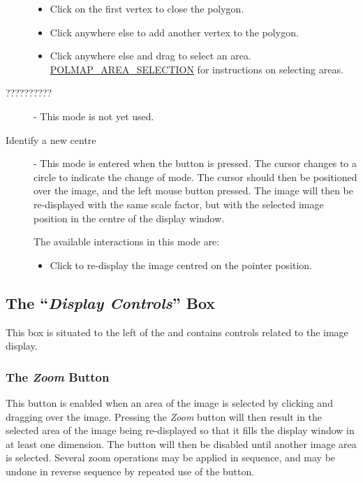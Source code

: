 \begin{description}
\begin{itemize}
\item Click on the first vertex to close the polygon.
\item Click anywhere else to add another vertex to the polygon.
\item Click anywhere else and drag to select an area. \hyperref{Go here}{See
section }{}{POLMAP_AREA_SELECTION} for instructions on selecting areas.
\end{itemize}

\item [\mylabel{POLMAP_MODE_3} ??????????] - This mode is not yet used.

\item [\mylabel{POLMAP_MODE_4} Identify a new centre] - This mode is
entered when the  button is pressed.
The cursor changes to a circle to indicate the change of mode. The cursor
should then be positioned over the image, and the left mouse button
pressed. The image will then be re-displayed with the same scale factor,
but with the selected image position in the centre of the display window.

The available interactions in this mode are:
\begin{itemize}
\item Click to re-display the image centred on the pointer position.
\end{itemize}

\end{description}

\subsection {The ``{\em Display Controls}'' Box}
This box is situated to the left of the  and contains controls related to the image
display.

\subsubsection {The {\em Zoom} Button}
This button is enabled when an area of the image is selected by clicking
and dragging over the image. Pressing the {\em Zoom} button will then
result in the selected area of the image being re-displayed so that it
fills the display window in at least one dimension. The button will then
be disabled until another image area is selected. Several zoom operations
may be applied in sequence, and may be undone in reverse sequence by
repeated use of the  button. 


